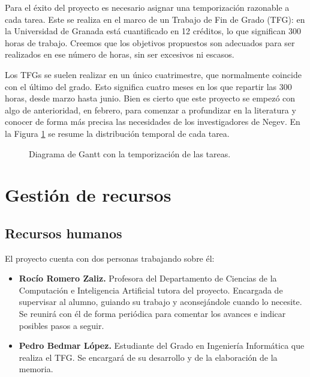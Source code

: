 Para el éxito del proyecto es necesario asignar una temporización razonable a cada tarea. Este se realiza en el marco de un Trabajo de Fin de Grado (TFG): en la Universidad de Granada está cuantificado en 12 créditos, lo que significan 300 horas de trabajo. Creemos que los objetivos propuestos son adecuados para ser realizados en ese número de horas, sin ser excesivos ni escasos.

Los TFGs se suelen realizar en un único cuatrimestre, que normalmente coincide con el último del grado. Esto significa cuatro meses en los que repartir las 300 horas, desde marzo hasta junio. Bien es cierto que este proyecto se empezó con algo de anterioridad, en febrero, para comenzar a profundizar en la literatura y conocer de forma más precisa las necesidades de los investigadores de Negev. En la Figura \ref{fig:gantt} se resume la distribución temporal de cada tarea.

\begin{figure}[H]
\centering
    \caption{Diagrama de Gantt con la temporización de las tareas.} 
    \label{fig:gantt}
\end{figure}

\section{Gestión de recursos}

\subsection{Recursos humanos}
\noindent El proyecto cuenta con dos personas trabajando sobre él:
\begin{itemize}
    \item \textbf{Rocío Romero Zaliz.} Profesora del Departamento de Ciencias de la Computación e Inteligencia Artificial tutora del proyecto. Encargada de supervisar al alumno, guiando su trabajo y aconsejándole cuando lo necesite. Se reunirá con él de forma periódica para comentar los avances e indicar posibles pasos a seguir.
    \item \textbf{Pedro Bedmar López.} Estudiante del Grado en Ingeniería Informática que realiza el TFG. Se encargará de su desarrollo y de la elaboración de la memoria.
\end{itemize}

